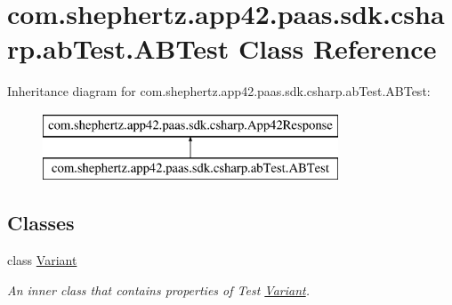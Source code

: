 \hypertarget{classcom_1_1shephertz_1_1app42_1_1paas_1_1sdk_1_1csharp_1_1ab_test_1_1_a_b_test}{\section{com.\+shephertz.\+app42.\+paas.\+sdk.\+csharp.\+ab\+Test.\+A\+B\+Test Class Reference}
\label{classcom_1_1shephertz_1_1app42_1_1paas_1_1sdk_1_1csharp_1_1ab_test_1_1_a_b_test}
}
Inheritance diagram for com.\+shephertz.\+app42.\+paas.\+sdk.\+csharp.\+ab\+Test.\+A\+B\+Test\+:\begin{figure}[H]
\begin{center}
\leavevmode
\includegraphics[height=2.000000cm]{classcom_1_1shephertz_1_1app42_1_1paas_1_1sdk_1_1csharp_1_1ab_test_1_1_a_b_test}
\end{center}
\end{figure}
\subsection*{Classes}
\begin{DoxyCompactItemize}
\item 
class \hyperlink{classcom_1_1shephertz_1_1app42_1_1paas_1_1sdk_1_1csharp_1_1ab_test_1_1_a_b_test_1_1_variant}{Variant}
\begin{DoxyCompactList}\small\item\em An inner class that contains properties of Test \hyperlink{classcom_1_1shephertz_1_1app42_1_1paas_1_1sdk_1_1csharp_1_1ab_test_1_1_a_b_test_1_1_variant}{Variant}. \end{DoxyCompactList}\end{DoxyCompactItemize}
